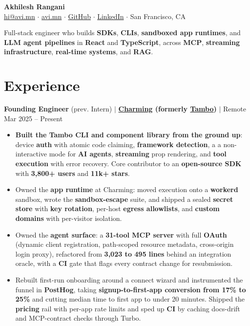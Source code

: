\documentclass[10pt,a4paper]{article}
\begin{document}
\begin{center}
    {\Large \textbf{Akhilesh Rangani}} \\[2pt]
    \small
    \href{mailto:hi@avi.mn}{hi@avi.mn} $\cdot$
    \href{https://avi.mn}{avi.mn} $\cdot$
    \href{https://github.com/akhileshrangani4}{GitHub} $\cdot$
    \href{https://linkedin.com/in/akhileshrangani}{LinkedIn} $\cdot$
    San Francisco, CA
\end{center}

\vspace{-2pt}
\small
Full-stack engineer who builds \textbf{SDKs}, \textbf{CLIs}, \textbf{sandboxed app runtimes}, and \textbf{LLM agent pipelines} in \textbf{React} and \textbf{TypeScript}, across \textbf{MCP}, \textbf{streaming infrastructure}, \textbf{real-time systems}, and \textbf{RAG}.

\section{Experience}

\textbf{Founding Engineer} (prev. Intern) $|$ \textbf{\href{https://usecharming.com}{Charming} (formerly \href{https://tambo.co}{Tambo})} $|$ Remote \hfill Mar 2025 -- Present
\begin{itemize}
    \item \textbf{Built the Tambo CLI and component library from the ground up}: device \textbf{auth} with atomic code claiming, \textbf{framework detection}, a a non-interactive mode for \textbf{AI agents}, \textbf{streaming} prop rendering, and \textbf{tool execution} with error recovery. Core contributor to an \textbf{open-source SDK} with \textbf{3,800+ users} and \textbf{11k+ stars}.
    \item Owned the \textbf{app runtime} at Charming: moved execution onto a \textbf{workerd} sandbox, wrote the \textbf{sandbox-escape} suite, and shipped a sealed \textbf{secret store} with \textbf{key rotation}, per-host \textbf{egress allowlists}, and \textbf{custom domains} with per-visitor isolation.
    \item Owned the \textbf{agent surface}: a \textbf{31-tool MCP server} with full \textbf{OAuth} (dynamic client registration, path-scoped resource metadata, cross-origin login proxy), refactored from \textbf{3,023 to 495 lines} behind an integration oracle, with a \textbf{CI} gate that flags every contract change for resubmission.
    \item Rebuilt first-run onboarding around a connect wizard and instrumented the funnel in \textbf{PostHog}, taking \textbf{signup-to-first-app conversion from 17\% to 25\%} and cutting median time to first app to under 20 minutes. Shipped the \textbf{pricing} rail with per-app rate limits and sped up \textbf{CI} by caching docs-drift and MCP-contract checks through Turbo.
\end{itemize}
\end{document}
